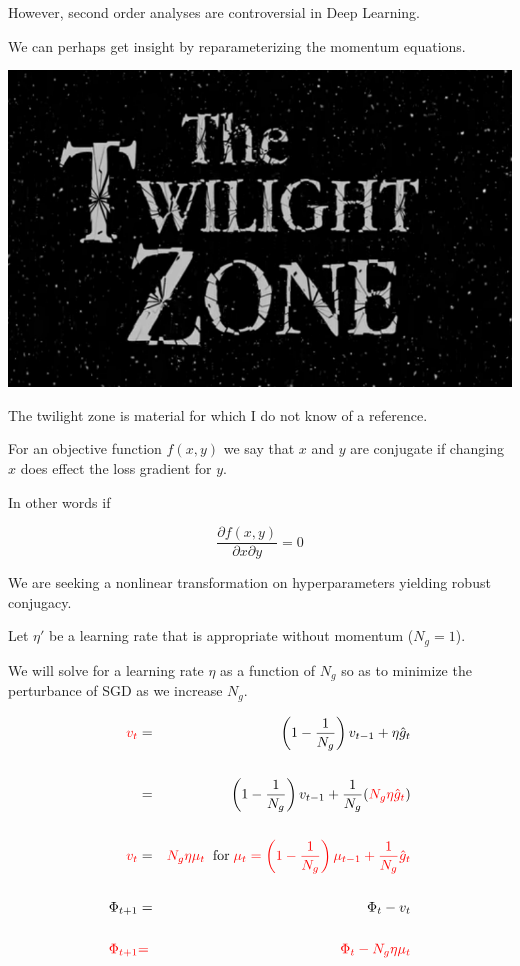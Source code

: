 {

However, second order analyses are controversial in Deep Learning.

\vfill
We can perhaps get insight by reparameterizing the momentum equations.


\centerline{\includegraphics[width = 6in]{../images/Twilight}}

\vfill
The twilight zone is material for which I do not know of a reference. 


For an objective function $f(x,y)$ we say that $x$ and $y$ are conjugate if changing $x$ does effect the loss gradient for $y$.

\vfill
In other words if

{\color{red} $$\frac{\partial f(x,y)}{\partial x \partial y} = 0$$}

\vfill
We are seeking a nonlinear transformation on hyperparameters yielding robust conjugacy.


Let $\eta'$ be a learning rate that is appropriate without momentum ($N_g = 1$).

\vfill
We will solve for a learning rate $\eta$ as a function of $N_g$ so as to minimize the perturbance of SGD
as we increase $N_g$.


\begin{eqnarray*}
{\color{red} v_t} & = & \left(1-\frac{1}{N_g}\right) v_{t-1} + \eta \hat{g}_t \\
\\
& = & \left(1-\frac{1}{N_g}\right) v_{t-1} + \frac{1}{N_g}({\color{red} N_g\eta \hat{g}_t}) \\
\\
{\color{red} v_t} & = & {\color{red} N_g\eta\mu_t}\;\;\mbox{for}\;{\color{red} \mu_t = \left(1-\frac{1}{N_g}\right)\mu_{t-1} + \frac{1}{N_g} \hat{g}_t} \\
\\
\Phi_{t+1} & = & \Phi_t - v_t \\
\\
{\color{red} \Phi_{t+1}} & {\color{red} =} & {\color{red} \Phi_t - N_g\eta\mu_t} 
\end{eqnarray*}

}
